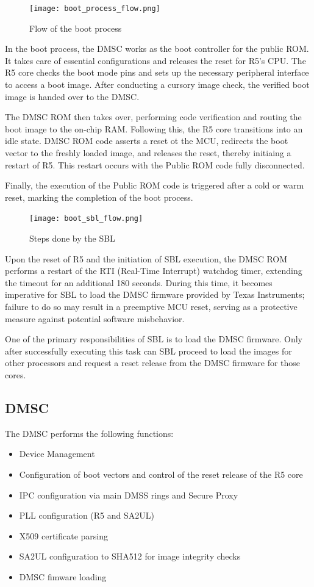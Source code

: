 \begin{figure}
    \centering
    \texttt{[image: boot\_process\_flow.png]}
    \caption{Flow of the boot process}
\end{figure}

In the boot process, the DMSC works as the boot controller for the public ROM.
It takes care of essential configurations and releases the reset for R5's CPU.
The R5 core checks the boot mode pins and sets up the necessary peripheral
interface to access a boot image. After conducting a cursory image check, the
verified boot image is handed over to the DMSC.

The DMSC ROM then takes over, performing code verification and routing the boot
image to the on-chip RAM. Following this, the R5 core transitions into an idle
state. DMSC ROM code asserts a reset ot the MCU, redirects the boot vector to
the freshly loaded image, and releases the reset, thereby initiaing a restart
of R5. This restart occurs with the Public ROM code fully disconnected.

Finally, the execution of the Public ROM code is triggered after a cold or warm
reset, marking the completion of the boot process.

\begin{figure}
    \centering
    \texttt{[image: boot\_sbl\_flow.png]}
    \caption{Steps done by the SBL}
\end{figure}

Upon the reset of R5 and the initiation of SBL execution, the DMSC ROM performs
a restart of the RTI (Real-Time Interrupt) watchdog timer, extending the
timeout for an additional 180 seconds.
During this time, it becomes imperative for SBL to load the DMSC firmware
provided by Texas Instruments; failure to do so may result in a preemptive MCU
reset, serving as a protective measure against potential software misbehavior.

One of the primary responsibilities of SBL is to load the DMSC firmware.
Only after successfully executing this task can SBL proceed to load the images
for other processors and request a reset release from the DMSC firmware for
those cores.

\subsection{DMSC}

The DMSC performs the following functions:

\begin{itemize}
    \item   Device Management
    \item   Configuration of boot vectors and control of the reset release
            of the R5 core
    \item   IPC configuration via main DMSS rings and Secure Proxy
    \item   PLL configuration (R5 and SA2UL)
    \item   X509 certificate parsing
    \item   SA2UL configuration to SHA512 for image integrity checks
    \item   DMSC fimware loading
\end{itemize}

